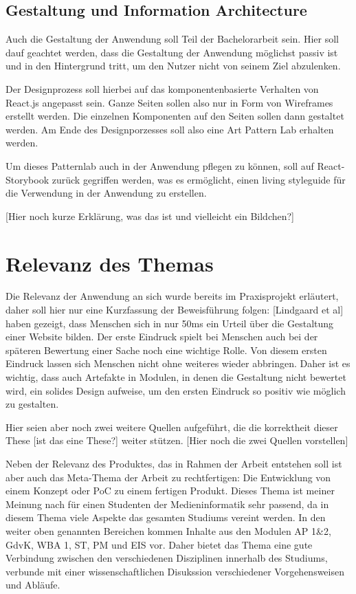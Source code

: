 \subsection{Gestaltung und Information Architecture}
Auch die Gestaltung der Anwendung soll Teil der Bachelorarbeit sein. Hier soll dauf geachtet werden, dass die Gestaltung der Anwendung möglichst passiv ist und in den Hintergrund tritt, um den Nutzer nicht von seinem Ziel abzulenken.

Der Designprozess soll hierbei auf das komponentenbasierte Verhalten von React.js angepasst sein. Ganze Seiten sollen also nur in Form von Wireframes erstellt werden. Die einzelnen Komponenten auf den Seiten sollen dann gestaltet werden. Am Ende des Designporzesses soll also eine Art Pattern Lab erhalten werden.

Um dieses Patternlab auch in der Anwendung pflegen zu können, soll auf React-Storybook zurück gegriffen werden, was es ermöglicht, einen living styleguide für die Verwendung in der Anwendung zu erstellen.

[Hier noch kurze Erklärung, was das ist und vielleicht ein Bildchen?]

\section{Relevanz des Themas}
Die Relevanz der Anwendung an sich wurde bereits im Praxisprojekt erläutert, daher soll hier nur eine Kurzfassung der Beweisführung folgen:
[Lindgaard et al] haben gezeigt, dass Menschen sich in nur 50ms ein Urteil über die Gestaltung einer Website bilden. Der erste Eindruck spielt bei Menschen auch bei der späteren Bewertung einer Sache noch eine wichtige Rolle.  Von diesem ersten Eindruck lassen sich Menschen nicht ohne weiteres wieder abbringen.
Daher ist es wichtig, dass auch Artefakte in Modulen, in denen die Gestaltung nicht bewertet wird, ein solides Design aufweise, um den ersten Eindruck so positiv wie möglich zu gestalten.

Hier seien aber noch zwei weitere Quellen aufgeführt, die die korrektheit dieser These [ist das eine These?] weiter stützen.
[Hier noch die zwei Quellen vorstellen]

Neben der Relevanz des Produktes, das in Rahmen der Arbeit entstehen soll ist aber auch das Meta-Thema der Arbeit zu rechtfertigen: Die Entwicklung von einem Konzept oder PoC zu einem fertigen Produkt.
Dieses Thema ist meiner Meinung nach für einen Studenten der Medieninformatik sehr passend, da in diesem Thema viele Aspekte das gesamten Studiums vereint werden. In den weiter oben genannten Bereichen kommen Inhalte aus den Modulen AP 1\&2, GdvK, WBA 1, ST,  PM und EIS vor. Daher bietet das Thema eine gute Verbindung zwischen den verschiedenen Disziplinen innerhalb des Studiums, verbunde mit einer wissenschaftlichen Disukssion verschiedener Vorgehensweisen und Abläufe.

